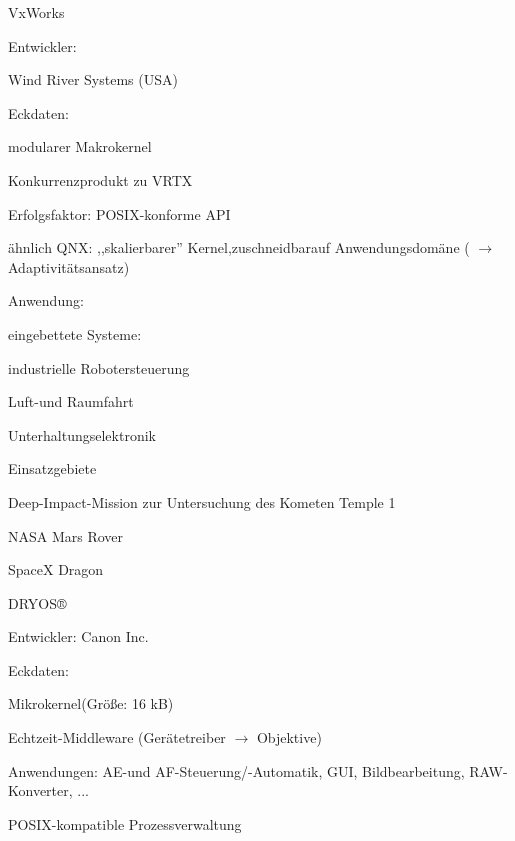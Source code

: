 \documentclass[a4paper]{article}
\begin{document}
\begin{multicols}{3}
    VxWorks

    \begin{itemize*}
        \item
        Entwickler:
        \begin{itemize*}
            \item Wind River Systems (USA)
        \end{itemize*}
        \item
        Eckdaten:
        \begin{itemize*}
            \item modularer Makrokernel
            \item Konkurrenzprodukt zu VRTX
            \item Erfolgsfaktor: POSIX-konforme API
            \item ähnlich QNX: ,,skalierbarer'' Kernel,zuschneidbarauf Anwendungsdomäne ( $\rightarrow$ Adaptivitätsansatz)
        \end{itemize*}
        \item
        Anwendung:
        \begin{itemize*}
            \item eingebettete Systeme:
            \item industrielle Robotersteuerung
            \item Luft-und Raumfahrt
            \item Unterhaltungselektronik
        \end{itemize*}
        \item
        Einsatzgebiete
        \begin{itemize*}
            \item Deep-Impact-Mission zur Untersuchung des Kometen Temple 1
            \item NASA Mars Rover
            \item SpaceX Dragon
        \end{itemize*}
    \end{itemize*}

    DRYOS®

    \begin{itemize*}
        \item
        Entwickler: Canon Inc.
        \item
        Eckdaten:
        \begin{itemize*}
            \item Mikrokernel(Größe: 16 kB)
            \item Echtzeit-Middleware (Gerätetreiber $\rightarrow$ Objektive)
            \item Anwendungen: AE-und AF-Steuerung/-Automatik, GUI, Bildbearbeitung, RAW-Konverter, ...
            \item POSIX-kompatible Prozessverwaltung
        \end{itemize*}
    \end{itemize*}


\end{multicols}
\end{document}
